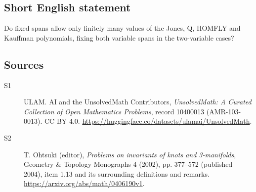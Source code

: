 \documentclass[11pt]{article}
\begin{document}
\subsection{Short English statement}
Do fixed spans allow only finitely many values of the Jones, Q, HOMFLY and Kauffman polynomials, fixing both variable spans in the two-variable cases?
\subsection{Sources}
\begin{description}
\item[\hypertarget{source:10400013:1}{S1}] ULAM. AI and the UnsolvedMath Contributors, \emph{UnsolvedMath: A Curated Collection of Open Mathematics Problems}, record 10400013 (AMR-103-0013). CC BY 4.0. \url{https://huggingface.co/datasets/ulamai/UnsolvedMath}.
\item[\hypertarget{source:10400013:2}{S2}] T. Ohtsuki (editor), \emph{Problems on invariants of knots and 3-manifolds}, Geometry \& Topology Monographs 4 (2002), pp. 377--572 (published 2004), item 1.13 and its surrounding definitions and remarks. \url{https://arxiv.org/abs/math/0406190v1}.
\end{description}
\label{end:10400013}
\end{document}
